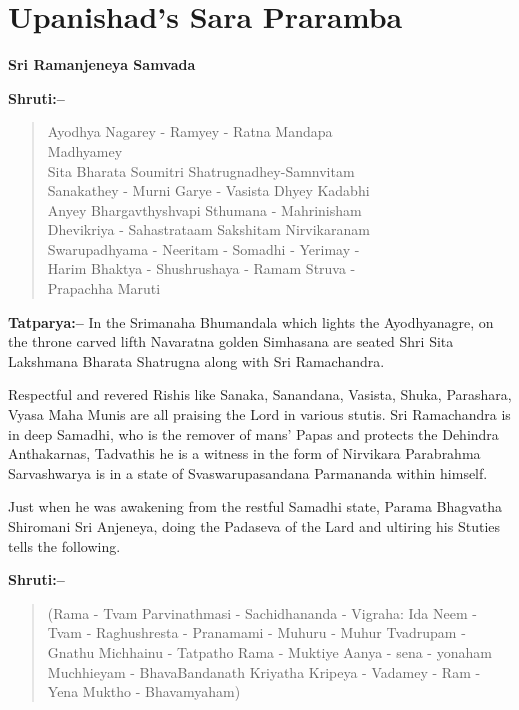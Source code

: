 
\chapter{Upanishad's Sara Praramba}

\begin{center}
\textbf{Sri Ramanjeneya Samvada}
\end{center}

\textbf{Shruti:–}

\begin{verse}
Ayodhya Nagarey - Ramyey - Ratna Mandapa \\ Madhyamey \\ Sita Bharata Soumitri Shatrugnadhey-Samnvitam \\ Sanakathey - Murni Garye - Vasista Dhyey Kadabhi \\ Anyey Bhargavthyshvapi Sthumana - Mahrinisham \\ Dhevikriya - Sahastrataam Sakshitam Nirvikaranam \\ Swarupadhyama - Neeritam - Somadhi - Yerimay -\\ Harim Bhaktya - Shushrushaya - Ramam Struva -\\ Prapachha Maruti 
\end{verse}

\textbf{Tatparya:–} In the Srimanaha Bhumandala which lights the Ayodhya\-nagre, on the throne carved lifth Navaratna golden Simhasana are seated Shri Sita Lakshmana Bharata Shatrugna along with Sri Ramachandra.

Respectful and revered Rishis like Sanaka, Sanandana, Vasista, Shuka, Parashara, Vyasa Maha Munis are all praising the Lord in various stutis. Sri Ramachandra is in deep Samadhi, who is the remover of mans' Papas and protects the Dehindra Anthakarnas, Tadvathis he is a witness in the form of Nirvikara Parabrahma Sarvashwarya is in a state of Svaswarupasandana Parmananda within himself.

\newpage

Just when he was awakening from the restful Samadhi state, Parama Bhagvatha Shiromani Sri Anjeneya, doing the Padaseva of the Lard and ultiring his Stuties tells the following.

\textbf{Shruti:–}

\begin{verse}
(Rama - Tvam Parvinathmasi - Sachidhananda - Vi\break graha:  Ida Neem - Tvam - Raghushresta - Pranamami - Muhuru - Muhur  Tvadrupam -Gnathu Michhainu - Tatpatho Rama - Muktiye  Aanya - sena - yonaham Muchhieyam - BhavaBandanath  Kriyatha Kripeya - Vadamey - Ram - Yena Muktho - Bhavamyaham)
\end{verse}

